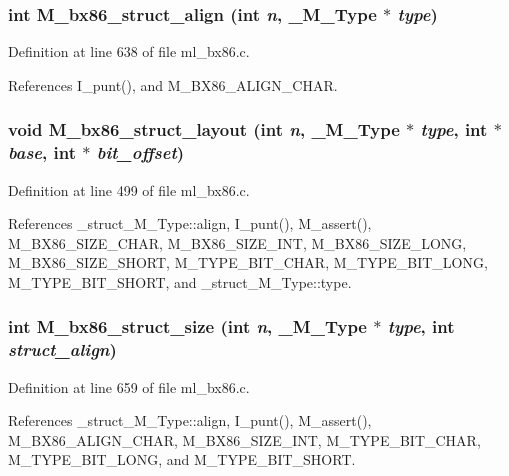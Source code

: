 \subsubsection{\setlength{\rightskip}{0pt plus 5cm}int M\_\-bx86\_\-struct\_\-align (int {\em n}, \bf{\_\-M\_\-Type} $\ast$ {\em type})}\label{ml__bx86_8c_317a57d7158d6594ec256c6fc738bdca}




Definition at line 638 of file ml\_\-bx86.c.

References I\_\-punt(), and M\_\-BX86\_\-ALIGN\_\-CHAR.
\subsubsection{\setlength{\rightskip}{0pt plus 5cm}void M\_\-bx86\_\-struct\_\-layout (int {\em n}, \bf{\_\-M\_\-Type} $\ast$ {\em type}, int $\ast$ {\em base}, int $\ast$ {\em bit\_\-offset})}\label{ml__bx86_8c_dde1201ea767874e04bed2cd5d876c9c}




Definition at line 499 of file ml\_\-bx86.c.

References \_\-struct\_\-M\_\-Type::align, I\_\-punt(), M\_\-assert(), M\_\-BX86\_\-SIZE\_\-CHAR, M\_\-BX86\_\-SIZE\_\-INT, M\_\-BX86\_\-SIZE\_\-LONG, M\_\-BX86\_\-SIZE\_\-SHORT, M\_\-TYPE\_\-BIT\_\-CHAR, M\_\-TYPE\_\-BIT\_\-LONG, M\_\-TYPE\_\-BIT\_\-SHORT, and \_\-struct\_\-M\_\-Type::type.
\subsubsection{\setlength{\rightskip}{0pt plus 5cm}int M\_\-bx86\_\-struct\_\-size (int {\em n}, \bf{\_\-M\_\-Type} $\ast$ {\em type}, int {\em struct\_\-align})}\label{ml__bx86_8c_178ec470e25149e4860c12c0f7f02b52}




Definition at line 659 of file ml\_\-bx86.c.

References \_\-struct\_\-M\_\-Type::align, I\_\-punt(), M\_\-assert(), M\_\-BX86\_\-ALIGN\_\-CHAR, M\_\-BX86\_\-SIZE\_\-INT, M\_\-TYPE\_\-BIT\_\-CHAR, M\_\-TYPE\_\-BIT\_\-LONG, and M\_\-TYPE\_\-BIT\_\-SHORT.
